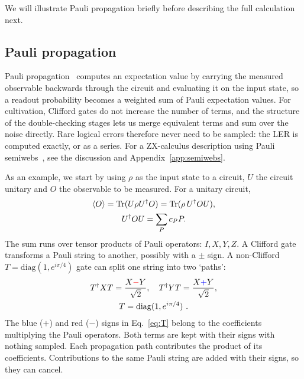 We will illustrate Pauli propagation briefly before describing the full calculation next.

\subsection{Pauli propagation}\label{sec:pp}

Pauli propagation~\cite{ppframework} computes an expectation value by carrying the measured observable backwards through the circuit and evaluating it on the input state, so a readout probability becomes a weighted sum of Pauli expectation values. For cultivation, Clifford gates do not increase the number of terms, and the structure of the double-checking stages lets us merge equivalent terms and sum over the noise directly. Rare logical errors therefore never need to be sampled: the LER is computed exactly, or as a series.
{\color{black}For a ZX-calculus description using Pauli semiwebs~\cite{zxflow}, see the discussion and Appendix~\ref{app:semiwebs}.}

As an example, we start by using $\rho$ as the input state to a circuit, $U$ the circuit unitary and
$O$ the observable to be measured. For a unitary circuit,
\begin{equation}
 \begin{gathered}
 \langle O\rangle=\operatorname{Tr}(U\rho U^\dagger O)
 =\operatorname{Tr}(\rho\,U^\dagger O U),\\
 U^\dagger O U=\sum_P c_P P.
 \end{gathered}
 \label{eq:heisenberg}
\end{equation}
The sum runs over tensor products of Pauli operators: $I,X,Y,Z$. A Clifford gate transforms
a Pauli string to another, possibly with a $\pm$ sign. A non-Clifford $T=\text{diag}(1,e^{i\pi/4})$ gate can
split one string into two `paths':
\begin{equation}
 \begin{gathered}
 T^\dagger X T=\frac{X{\color{red}-}Y}{\sqrt2},\quad
 T^\dagger Y T=\frac{X{\color{blue}+}Y}{\sqrt2},\\
 T=\operatorname{diag}(1,e^{i\pi/4}) \ .
 \end{gathered}
 \label{eq:T}
\end{equation}
The {\color{blue}blue ($+$)} and {\color{red}red ($-$)} signs in
Eq.~\eqref{eq:T} belong to the coefficients multiplying the Pauli
operators. Both terms are kept with their signs with nothing sampled. Each propagation path contributes the product
of its coefficients. Contributions to the same Pauli string are added
with their signs, so they can cancel.

